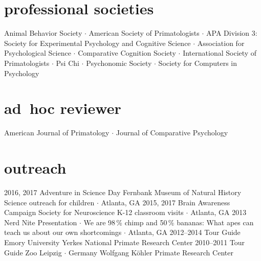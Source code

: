 \documentclass[]{friggeri-cv}
\begin{document}
\section{professional societies}
    Animal Behavior Society $\cdot$ %
    American Society of Primatologists $\cdot$ %
    APA Division 3: Society for Experimental Psychology and Cognitive Science $\cdot$ %
    Association for Psychological Science $\cdot$ %
    Comparative Cognition Society $\cdot$ %
    International Society of Primatologists $\cdot$ %
    Psi Chi $\cdot$ %
    Psychonomic Society $\cdot$ %
    Society for Computers in Psychology \\[.5cm]


\section{ad~hoc reviewer}
    American Journal of Primatology $\cdot$ Journal of Comparative Psychology \\[.5cm]



\section{outreach}

\begin{entrylist}
  \entry
    {2016, 2017}
    {Adventure in Science Day}
    {Fernbank Museum of Natural History}
    {Science outreach for children $\cdot$ Atlanta, GA}
  \entry
    {2015, 2017}
    {Brain Awareness Campaign}
    {Society for Neuroscience}
    {K-12 classroom visits $\cdot$ Atlanta, GA}
  \entry
    {2013}
    {Nerd Nite}
    {}
    {Presentation $\cdot$ We are 98\,\% chimp and 50\,\% bananas: What apes can teach us about our own shortcomings $\cdot$ Atlanta, GA}
  \entry
    {2012--2014}
    {Tour Guide}
    {Emory University}
    {Yerkes National Primate Research Center}
  \entry
    {2010--2011}
    {Tour Guide}
    {Zoo Leipzig $\cdot$ Germany}
    {Wolfgang K\"{o}hler Primate Research Center}
\end{entrylist}
\end{document}
